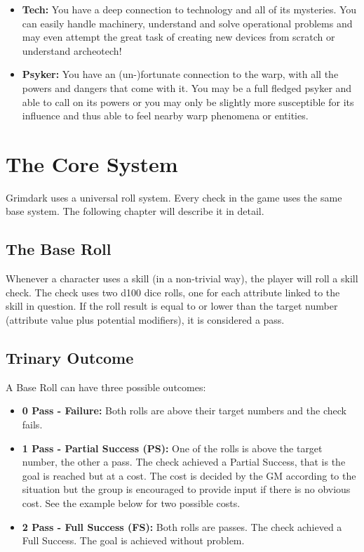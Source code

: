 \begin{itemize}
	\item \textbf{Tech:} You have a deep connection to technology and all of its mysteries. You can easily handle machinery, understand and solve operational problems and may even attempt the great task of creating new devices from scratch or understand archeotech!
	\item \textbf{Psyker:} You have an (un-)fortunate connection to the warp, with all the powers and dangers that come with it. You may be a full fledged psyker and able to call on its powers or you may only be slightly more susceptible for its influence and thus able to feel nearby warp phenomena or entities.
\end{itemize}




\section{The Core System} %
\label{sec:base_system}
Grimdark uses a universal roll system. Every check in the game uses the same base system. The following chapter will describe it in detail.
\subsection{The Base Roll}
Whenever a character uses a skill (in a non-trivial way), the player will roll a skill check.
The check uses two d100 dice rolls, one for each attribute linked to the skill in question.
If the roll result is equal to or lower than the target number (attribute value plus potential modifiers), it is considered a pass.

\subsection{Trinary Outcome}
A Base Roll can have three possible outcomes: \\
\begin{itemize}
	\item \textbf{0 Pass - Failure:} Both rolls are above their target numbers and the check fails.
	\item \textbf{1 Pass - Partial Success (PS):} One of the rolls is above the target number, the other a pass. The check achieved a Partial Success, that is the goal is reached but at a cost. The cost is decided by the GM according to the situation but the group is encouraged to provide input if there is no obvious cost. See the example below for two possible costs.
	\item \textbf{2 Pass - Full Success (FS):} Both rolls are passes. The check achieved a Full Success. The goal is achieved without problem.
\end{itemize}

